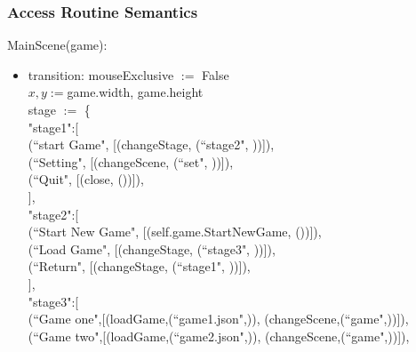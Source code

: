 \documentclass{article}
\begin{document}
\subsubsection {Access Routine Semantics}
\noindent MainScene(game):
\begin{itemize}
\item transition: mouseExclusive $:=$ False\\
    $x,y := $game.width, game.height\\
    stage $:=$ \{\\
    \hspace*{3mm}"stage1":[\\
    \hspace*{3mm}\hspace*{3mm}(``start Game", [(changeStage, (``stage2", ))]),\\
    \hspace*{3mm}\hspace*{3mm}(``Setting", [(changeScene, (``set", ))]),\\
    \hspace*{3mm}\hspace*{3mm}(``Quit", [(close, ())]),\\
    \hspace*{3mm}],\\
    \hspace*{3mm} "stage2":[\\
    \hspace*{3mm}\hspace*{3mm}(``Start New Game", [(self.game.StartNewGame, ())]),\\
    \hspace*{3mm}\hspace*{3mm}(``Load Game", [(changeStage, (``stage3", ))]),\\
    \hspace*{3mm}\hspace*{3mm}(``Return", [(changeStage, (``stage1", ))]),\\
    \hspace*{3mm}],\\
    \hspace*{3mm}"stage3":[\\
    \hspace*{3mm}\hspace*{3mm}(``Game one",[(loadGame,(``game1.json",)), (changeScene,(``game",))]),\\
    \hspace*{3mm}\hspace*{3mm}(``Game two",[(loadGame,(``game2.json",)), (changeScene,(``game",))]),\\

\end{itemize}
\end{document}
